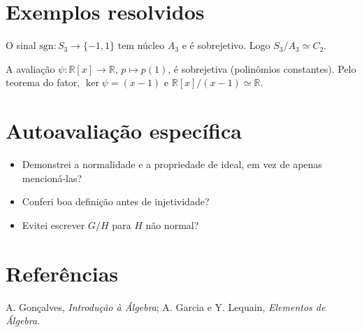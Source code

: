 \documentclass[11pt,a4paper]{article}
\begin{document}
\section{Exemplos resolvidos}
O sinal $\mathrm{sgn}:S_3\to\{-1,1\}$ tem núcleo $A_3$ e é sobrejetivo. Logo $S_3/A_3\simeq C_2$.

A avaliação $\psi:\mathbb R[x]\to\mathbb R$, $p\mapsto p(1)$, é sobrejetiva (polinômios constantes). Pelo teorema do fator, $\ker\psi=(x-1)$ e $\mathbb R[x]/(x-1)\simeq\mathbb R$.
\section{Autoavaliação específica}
\begin{itemize}
\item Demonstrei a normalidade e a propriedade de ideal, em vez de apenas mencioná-las?
\item Conferi boa definição antes de injetividade?
\item Evitei escrever $G/H$ para $H$ não normal?
\end{itemize}
\RubricaUFMT
\section{Referências}
A. Gonçalves, \emph{Introdução à Álgebra}; A. Garcia e Y. Lequain, \emph{Elementos de Álgebra}.
\end{document}
